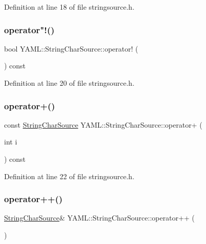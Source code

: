 Definition at line 18 of file stringsource.\+h.

\mbox{\label{class_y_a_m_l_1_1_string_char_source_aa0fb3acf86a734c0a0de0759a47398c6}} 
\subsubsection{\texorpdfstring{operator"!()}{operator!()}}
{\footnotesize\ttfamily bool Y\+A\+M\+L\+::\+String\+Char\+Source\+::operator! (\begin{DoxyParamCaption}{ }\end{DoxyParamCaption}) const\hspace{0.3cm}{\ttfamily [inline]}}



Definition at line 20 of file stringsource.\+h.

\mbox{\label{class_y_a_m_l_1_1_string_char_source_a5e5ff972b0bb13ff47a5213b284e1a16}} 
\subsubsection{\texorpdfstring{operator+()}{operator+()}}
{\footnotesize\ttfamily const \mbox{\hyperlink{class_y_a_m_l_1_1_string_char_source}{String\+Char\+Source}} Y\+A\+M\+L\+::\+String\+Char\+Source\+::operator+ (\begin{DoxyParamCaption}\item[{int}]{i }\end{DoxyParamCaption}) const\hspace{0.3cm}{\ttfamily [inline]}}



Definition at line 22 of file stringsource.\+h.

\mbox{\label{class_y_a_m_l_1_1_string_char_source_afd812171da46914f8c202340b93476d1}} 
\subsubsection{\texorpdfstring{operator++()}{operator++()}}
{\footnotesize\ttfamily \mbox{\hyperlink{class_y_a_m_l_1_1_string_char_source}{String\+Char\+Source}}\& Y\+A\+M\+L\+::\+String\+Char\+Source\+::operator++ (\begin{DoxyParamCaption}{ }\end{DoxyParamCaption})\hspace{0.3cm}{\ttfamily [inline]}}



